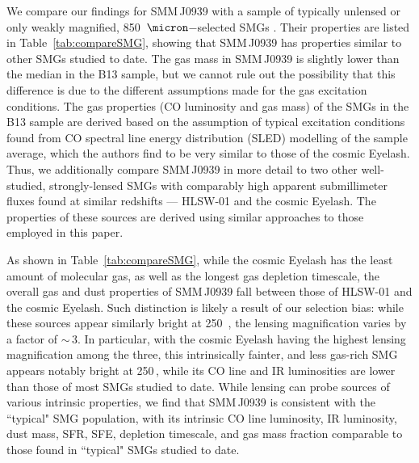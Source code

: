 \documentclass[iop, revtex4]{emulateapj}
\begin{document}
We
compare our findings for SMM\,J0939
with a sample of typically unlensed or only weakly magnified, 850~$\micron$$-$selected SMGs \citep[][hereafter B13]{Bothwell13a}.
Their properties are listed in Table~\ref{tab:compareSMG}, showing that SMM\,J0939 has properties similar
to other SMGs studied to date.
The gas mass in SMM\,J0939 is slightly lower than the median in the B13 sample, but we cannot rule out the possibility that this difference is due to the different assumptions made for the gas excitation conditions.
The gas properties (CO luminosity and gas mass) of the SMGs in the B13 sample are derived based on the assumption of typical excitation conditions found from CO spectral line energy distribution (SLED) modelling of the sample average, which the authors find to be very similar to those of the cosmic Eyelash. Thus, we additionally compare SMM\,J0939 in more detail to two other well-studied, strongly-lensed SMGs
with comparably high apparent submillimeter fluxes
found at similar redshifts --- HLSW-01 and the cosmic Eyelash.
The properties of these sources are derived using similar approaches to those employed in this paper.

As shown in Table~\ref{tab:compareSMG}, while the cosmic Eyelash has the least amount of molecular gas, as well as
the
longest gas depletion timescale, the overall gas and dust properties of SMM\,J0939 fall between those of HLSW-01 and the
cosmic
Eyelash. Such distinction is likely a result of our selection bias: while these sources appear similarly bright at 250~\micron, the lensing magnification
varies by a factor of $\sim$\,3. In particular, with the cosmic Eyelash having the highest lensing magnification among the
three, this
intrinsically fainter, and less gas-rich SMG appears notably bright
at 250\,\micron, while its CO line and IR luminosities are lower than those of most SMGs studied to date.
While lensing can probe sources
of various intrinsic properties, we find that
SMM\,J0939 is consistent with the ``typical" SMG population, with its intrinsic CO line luminosity, IR luminosity,
dust mass, SFR, SFE, depletion timescale, and gas mass fraction comparable to those found in ``typical" SMGs studied to date.
\end{document}
